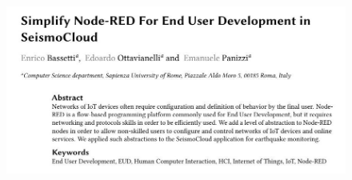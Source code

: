 \begin{frame}
\begin{figure}
    \centering
    \includegraphics[width=1\textwidth]{images/paper.jpg}
    \label{fig:paper}
\end{figure}
\end{frame}

